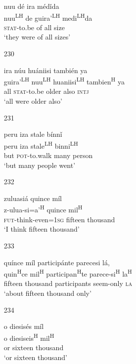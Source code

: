 \begin{itemize}
\glll   nuu d\'{e} ira m\'{e}d\v{i}da\\
nuu\textsuperscript{LH} de guira'\textsuperscript{LH} medi\textsuperscript{LH}da\\
 \textsc{stat}-to.be of all size \\
\glt  `they were of all sizes'
 


\item[230]
 
\glll   ira n\'{u}u hu\'{a}niisi tambi\'{e}n ya\\
 guira'\textsuperscript{LH} nuu\textsuperscript{LH} huaniisi\textsuperscript{LH} tambien\textsuperscript{H} ya\\
 all \textsc{stat}-to.be older also \textsc{intj}\\
\glt `all were older also'
 



\item[231]
 
\glll   peru iza stale b\'{i}nn\v{i} \\
peru iza stale\textsuperscript{LH} binni\textsuperscript{LH}\\
but \textsc{pot}-to.walk many person\\
\glt `but many people went'
 


\item[232]
 
\glll   zuluasi\'{a} quince m\'{i}l\\
z-ulua-si=a'\textsuperscript{H} quince mil\textsuperscript{H}\\
 \textsc{fut}-think-even=\textsc{1sg} fifteen thousand\\
\glt `I think fifteen thousand'
 


\item[233]
 
\glll   qu\'{i}nce m\'{i}l particip\'{a}nte parecesi l\'{a},\\
 quin\textsuperscript{H}ce mil\textsuperscript{H} participan\textsuperscript{H}te parece-si\textsuperscript{H} la\textsuperscript{H} \\
fifteen thousand participants seem-only \textsc{la}\\
\glt `about fifteen thousand only'
 


\item[234]
 
\glll   o diesis\'{e}s m\'{i}l\\
 o diesiseis\textsuperscript{H} mil\textsuperscript{H}\\
or sixteen thousand\\
\glt `or sixteen thousand'
 



\end{itemize}
